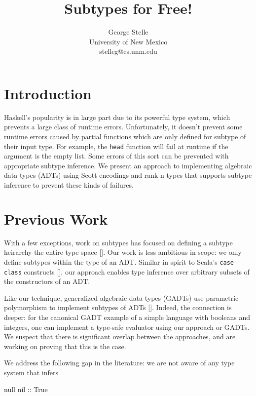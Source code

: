 \documentclass[]{article}
\title{Subtypes for Free!}
\author{George Stelle \\ University of New Mexico \\ stelleg@cs.unm.edu}
\date{}
\newenvironment{Shaded}{}{}
\newcommand{\DataTypeTok}[1]{\textcolor[rgb]{0.56,0.13,0.00}{{#1}}}
\newcommand{\OtherTok}[1]{\textcolor[rgb]{0.00,0.44,0.13}{{#1}}}
\newcommand{\NormalTok}[1]{{#1}}
\begin{document}
\maketitle

\section{Introduction}\label{introduction}

Haskell's popularity is in large part due to its powerful type system,
which prevents a large class of runtime errors. Unfortunately, it
doesn't prevent some runtime errors caused by partial functions which
are only defined for subtype of their input type. For example, the
\texttt{head} function will fail at runtime if the argument is the empty
list. Some errors of this sort can be prevented with appropriate subtype
inference. We present an approach to implementing algebraic data types
(ADTs) using Scott encodings and rank-n types that supports subtype
inference to prevent these kinds of failures.

\section{Previous Work}\label{previous-work}

With a few exceptions, work on subtypes has focused on defining a
subtype heirarchy the entire type space
{[}\cite{mitchell1991type, liskov1994behavioral}{]}. Our work is less
ambitious in scope: we only define subtypes within the type of an ADT.
Similar in spirit to Scala's \texttt{case class} constructs
{[}\cite{odersky2004overview}{]}, our approach enables type inference
over arbitrary subsets of the constructors of an ADT.

Like our technique, generalized algebraic data types (GADTs) use
parametric polymorphism to implement subtypes of ADTs
{[}\cite{fluet2006phantom}{]}. Indeed, the connection is deeper: for the
canonical GADT example of a simple language with booleans and integers,
one can implement a type-safe evaluator using our approach or GADTs. We
suspect that there is significant overlap between the approaches, and
are working on proving that this is the case.

We address the following gap in the literature: we are not aware of any
type system that infers

\begin{Shaded}
\begin{Highlighting}[]
   \NormalTok{null}\OtherTok{ nil ::} \DataTypeTok{True}
\end{Highlighting}
\end{Shaded}
\end{document}
